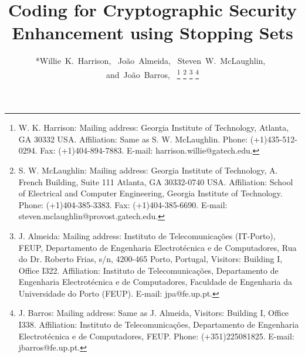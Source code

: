 \documentclass[10pt,twocolumn,twoside]{IEEEtran} \newlength{\pic}
\theoremstyle{definition}
\theoremstyle{remark}
\theoremstyle{plain}
\begin{document}
\title{Coding for Cryptographic Security Enhancement using Stopping Sets}

\author{*Willie~K.~Harrison,~
        Jo\~{a}o~Almeida,~
        Steven~W.~McLaughlin,~
        and~Jo\~{a}o~Barros,~\ifCLASSOPTIONpeerreview
\thanks{W. K. Harrison: Mailing address: Georgia Institute of Technology, Atlanta, GA 30332 USA. Affiliation: Same as S. W. McLaughlin. Phone: (+1)435-512-0294. Fax: (+1)404-894-7883. E-mail: harrison.willie@gatech.edu.}
\thanks{S. W. McLaughlin: Mailing address: Georgia Institute of Technology, A. French Building, Suite 111 Atlanta, GA 30332-0740 USA. Affiliation: School of Electrical and Computer Engineering, Georgia Institute of Technology. Phone: (+1)404-385-3383. Fax: (+1)404-385-6690. E-mail: steven.mclaughlin@provost.gatech.edu.}
\thanks{J. Almeida: Mailing address: Instituto de Telecomunica\c{c}\~{o}es (IT-Porto), FEUP, Departamento de Engenharia Electrot\'{e}cnica e de Computadores, Rua do Dr. Roberto Frias, s/n, 4200-465 Porto, Portugal, Visitors: Building I, Office I322. Affiliation: Instituto de Telecomunica\c{c}\~{o}es, Departamento de Engenharia Electrot\'{e}cnica e de Computadores, Faculdade de Engenharia da Universidade do Porto (FEUP). E-mail: jpa@fe.up.pt.}
\thanks{J. Barros: Mailing address: Same as J. Almeida, Visitors: Building I, Office I338. Affiliation: Instituto de Telecomunica\c{c}\~{o}es, Departamento de Engenharia Electrot\'{e}cnica e de Computadores, FEUP. Phone: (+351)225081825. E-mail: jbarros@fe.up.pt.}
\else
\fi}



\ifCLASSOPTIONpeerreview
{} \else
\fi

\maketitle
\end{document}
